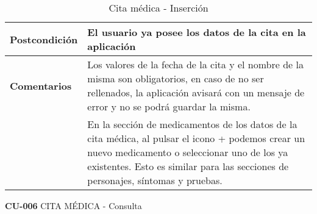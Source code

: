 \documentclass[../pfc.tex]{subfiles}
\begin{document}
\begin{table}[H]
\begin{tabular}[t]{|p{3cm}|p{9.5cm}|}
			\hline \textbf{Postcondición} & El usuario ya posee los datos de la cita en la aplicación \\* 
			\hline \textbf{Comentarios}   & Los valores de la fecha de la cita y el nombre de la misma son obligatorios, en caso de no ser rellenados, la aplicación avisará con un mensaje de error y no se podrá guardar la misma.\\*
			& En la sección de medicamentos de los datos de la cita médica, al pulsar el icono + podemos crear un nuevo medicamento o seleccionar uno de los ya existentes. Esto es similar para las secciones de personajes, síntomas y pruebas.\\*
			\hline
		\end{tabular}
		\caption{Cita médica - Inserción}
		\label{tabla:caso005}

	\end{table}

	\clearpage

	\textbf{CU-006}	CITA MÉDICA - Consulta
	
\end{document}
